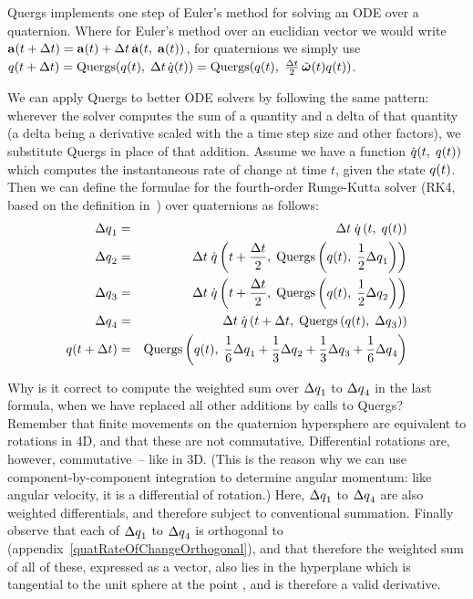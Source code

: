 Quergs implements one step of Euler's method for solving an ODE over a quaternion.
Where for Euler's method over an euclidian vector we would write
$\ve{a}(t + \Delta t) = \ve{a}(t) + \Delta t\,\dot{\ve{a}}(t,\;\ve{a}(t))$,
for quaternions we simply use
$\q{q}(t + \Delta t) = \mathrm{Quergs}(\q{q}(t),\; \Delta t\,\dot{\q{q}}(t)) =
    \mathrm{Quergs}(\q{q}(t),\; \frac{\Delta t}{2}\,\tilde{\ve{\omega}}(t)\q{q}(t))$.

We can apply Quergs to better ODE solvers by following the same pattern: wherever the solver
computes the sum of a quantity and a delta of that quantity (a delta being a derivative
scaled with the a time step size and other factors), we substitute Quergs in place of that
addition. Assume we have a function $\dot{\mbox{$q$}}(t,\; \mbox{$q$}(t))$ which computes the
instantaneous rate of change at time $t$, given the state $\mbox{$q$}(t)$. Then we can define
the formulae for the fourth-order Runge-Kutta solver (RK4, based on the definition
in~\cite{NRinC}) over quaternions as follows:
\begin{eqnarray*}
\Delta\mbox{$q$}_1 & = & \Delta t\;\dot{\mbox{$q$}}\left(t,\;\mbox{$q$}(t)\right) \\
\Delta\mbox{$q$}_2 & = & \Delta t\;\dot{\mbox{$q$}}\left(t + \frac{\Delta t}{2},\;
    \mathrm{Quergs}\left(\mbox{$q$}(t),\; \frac{1}{2}\Delta\mbox{$q$}_1\right)\right) \\
\Delta\mbox{$q$}_3 & = & \Delta t\;\dot{\mbox{$q$}}\left(t + \frac{\Delta t}{2},\;
    \mathrm{Quergs}\left(\mbox{$q$}(t),\; \frac{1}{2}\Delta\mbox{$q$}_2\right)\right) \\
\Delta\mbox{$q$}_4 & = & \Delta t\;\dot{\mbox{$q$}}\left(t + \Delta t,\;
    \mathrm{Quergs}\left(\mbox{$q$}(t),\; \Delta\mbox{$q$}_3\right)\right) \\
\mbox{$q$}(t + \Delta t) & = & \mathrm{Quergs}\left(\mbox{$q$}(t),\;
    \frac{1}{6}\Delta\mbox{$q$}_1 + \frac{1}{3}\Delta\mbox{$q$}_2 +
    \frac{1}{3}\Delta\mbox{$q$}_3 + \frac{1}{6}\Delta\mbox{$q$}_4\right)
\end{eqnarray*}

Why is it correct to compute the weighted sum over $\Delta\mbox{$q$}_1$ to
$\Delta\mbox{$q$}_4$ in the last formula, when we have replaced all other additions
by calls to Quergs? Remember that finite movements on the quaternion hypersphere are
equivalent to rotations in 4D, and that these are not commutative. Differential
rotations are, however, commutative~-- like in 3D. (This is the reason why we can
use component-by-component integration to determine angular momentum:
like angular velocity, it is a differential of rotation.) Here, $\Delta\mbox{$q$}_1$ to
$\Delta\mbox{$q$}_4$ are also weighted differentials, and therefore subject to
conventional summation. Finally observe that each of $\Delta\mbox{$q$}_1$ to
$\Delta\mbox{$q$}_4$ is orthogonal to  (appendix~\ref{quatRateOfChangeOrthogonal}),
and that therefore the weighted sum of all of these, expressed as a vector, also
lies in the hyperplane which is tangential to the unit sphere at the point ,
and is therefore a valid derivative.
